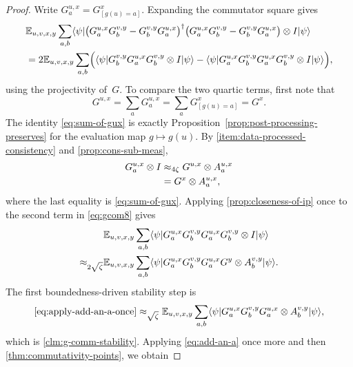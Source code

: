 \begin{proof}
	\leanok
	Write $G_a^{u,x}=G^x_{[g(u)=a]}$. Expanding the commutator square gives
	\begin{align}
		 & \mathbb{E}_{u,v,x,y} \sum_{a,b} \langle \psi \rvert
		\bigl(G_a^{u,x} G_b^{v,y} - G_b^{v,y} G_a^{u,x}\bigr)^\dagger
		\bigl(G_a^{u,x} G_b^{v,y} - G_b^{v,y} G_a^{u,x}\bigr)
		\otimes I \lvert \psi \rangle\nonumber             \\
		 & = 2 \mathbb{E}_{u,v,x,y} \sum_{a,b}
		\Bigl(\langle \psi \rvert G_b^{v,y} G_a^{u,x} G_b^{v,y} \otimes I \lvert \psi \rangle
		- \langle \psi \rvert G_a^{u,x} G_b^{v,y} G_a^{u,x} G_b^{v,y} \otimes I \lvert \psi \rangle\Bigr),
		\label{eq:gcom8}
	\end{align}
	using the projectivity of~$G$. To compare the two quartic terms, first note that
	\begin{equation}\label{eq:sum-of-gux}
		G^{u,x} = \sum_a G_a^{u,x} = \sum_a G^x_{[g(u)=a]} = G^x.
	\end{equation}
	The identity \eqref{eq:sum-of-gux} is exactly Proposition~\ref{prop:post-processing-preserves} for the evaluation map $g \mapsto g(u)$.
	By \ref{item:data-processed-consistency} and \ref{prop:cons-sub-meas},
	\begin{align}
		G_a^{u,x} \otimes I
		 & \approx_{4\zeta} G^{u,x} \otimes A_a^{u,x}\nonumber \\
		 & = G^x \otimes A_a^{u,x}, \label{eq:add-an-a}
	\end{align}
	where the last equality is \ref{eq:sum-of-gux}. Applying \ref{prop:closeness-of-ip} once to the second term in \ref{eq:gcom8} gives
	\begin{align}
		                        & \mathbb{E}_{u,v,x,y} \sum_{a,b}
		\langle \psi \rvert G_a^{u,x} G_b^{v,y} G_a^{u,x} G_b^{v,y} \otimes I \lvert \psi \rangle\nonumber \\
		\approx_{2\sqrt{\zeta}} &
		\mathbb{E}_{u,v,x,y} \sum_{a,b}
		\langle \psi \rvert G_a^{u,x} G_b^{v,y} G_a^{u,x} G^y \otimes A_b^{v,y} \lvert \psi \rangle.
		\label{eq:apply-add-an-a-once}
	\end{align}
	The first boundedness-driven stability step is
	\begin{equation}
		\eqref{eq:apply-add-an-a-once}
		\approx_{\sqrt{\zeta}}
		\mathbb{E}_{u,v,x,y} \sum_{a,b}
		\langle \psi \rvert G_a^{u,x} G_b^{v,y} G_a^{u,x} \otimes A_b^{v,y} \lvert \psi \rangle,
		\label{eq:gcom9}
	\end{equation}
	which is \ref{clm:g-comm-stability}. Applying \ref{eq:add-an-a} once more and then \ref{thm:commutativity-points}, we obtain

\end{proof}
